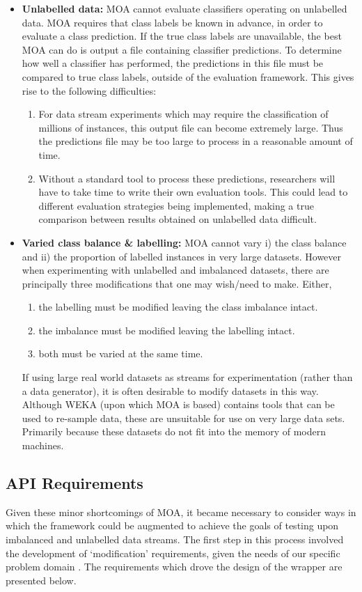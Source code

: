 \documentclass[twoside,a4paper]{refart}
\begin{document}
\begin{itemize}
\item{\textbf{Unlabelled data:}} MOA cannot evaluate classifiers operating on unlabelled data. MOA requires that class labels be known in advance, in order to evaluate a class prediction. If the true class labels are unavailable, the best MOA can do is output a file containing classifier predictions. To determine how well a classifier has performed, the predictions in this file must be compared to true class labels, outside of the evaluation framework. This gives rise to the following difficulties:
\begin{enumerate}
\item For data stream experiments which may require the classification of millions of instances, this output file can become extremely large. Thus the predictions file may be too large to process in a reasonable amount of time.
\item Without a standard tool to process these predictions, researchers will have to take time to write their own evaluation tools. This could lead to different evaluation strategies being implemented, making a true comparison between results obtained on unlabelled data difficult.
\end{enumerate}
\item{\textbf{Varied class balance \& labelling:}} MOA cannot vary i) the class balance and ii) the proportion of labelled instances in very large datasets. However when experimenting with unlabelled and imbalanced datasets, there are principally three modifications that one may wish/need to make. Either, 
\begin{enumerate}
\item the labelling must be modified leaving the class imbalance intact.
\item the imbalance must be modified leaving the labelling intact.
\item both must be varied at the same time.
\end{enumerate}
If using large real world datasets as streams for experimentation (rather than a data generator), it is often desirable to modify datasets in this way. Although WEKA (upon which MOA is based) contains tools that can be used to re-sample data, these are unsuitable for use on very large data sets. Primarily because these datasets do not fit into the memory of modern machines.
\end{itemize} 

\subsection{API Requirements}
\label{sec:requirements}
Given these minor shortcomings of MOA,  it became necessary to consider ways in which the framework could be augmented to achieve the goals of testing upon imbalanced and unlabelled data streams. The first step in this process involved the development of `modification' requirements, given the needs of our specific problem domain \cite{Lyon:2013:jk,Lyon:2014:jk}. The requirements which drove the design of the wrapper are presented below.
\end{document}
